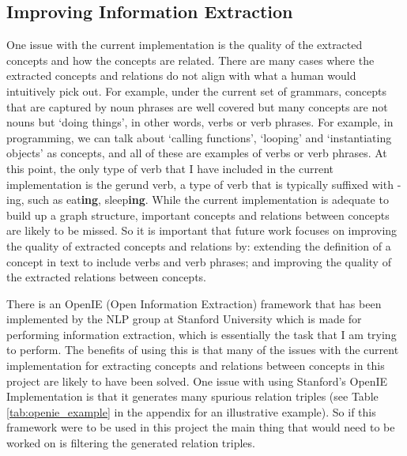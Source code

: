 \documentclass[12pt]{article}
\theoremstyle{grammarstyle}
\begin{document}
\subsection{Improving Information Extraction}
One issue with the current implementation is the quality of the extracted concepts and how the concepts are related. There are many cases where the extracted concepts and relations do not align with what a human would intuitively pick out. For example, under the current set of grammars, concepts that are captured by noun phrases are well covered but many concepts are not nouns but `doing things', in other words, verbs or verb phrases. For example, in programming, we can talk about `calling functions', `looping' and `instantiating  objects' as concepts, and all of these are examples of verbs or verb phrases. At this point, the only type of verb that I have included in the current implementation is the gerund verb, a type of verb that is typically suffixed with -ing, such as eat\textbf{ing}, sleep\textbf{ing}. While the current implementation is adequate to build up a graph structure, important concepts and relations between concepts are likely to be missed. So it is important that future work focuses on improving the quality of extracted concepts and relations by: extending the definition of a concept in text to include verbs and verb phrases; and improving the quality of the extracted relations between concepts. 

There is an OpenIE (Open Information Extraction) framework that has been implemented by the NLP group at Stanford University \citep{manning-EtAl:2014:P14-5, angeli2015leveraging} which is made for performing information extraction, which is essentially the task that I am trying to perform. The benefits of using this is that many of the issues with the current implementation for extracting concepts and relations between concepts in this project are likely to have been solved. One issue with using Stanford's OpenIE Implementation is that it generates many spurious relation triples (see Table \ref{tab:openie_example} in the appendix for an illustrative example). So if this framework were to be used in this project the main thing that would need to be worked on is filtering the generated relation triples.
\end{document}
